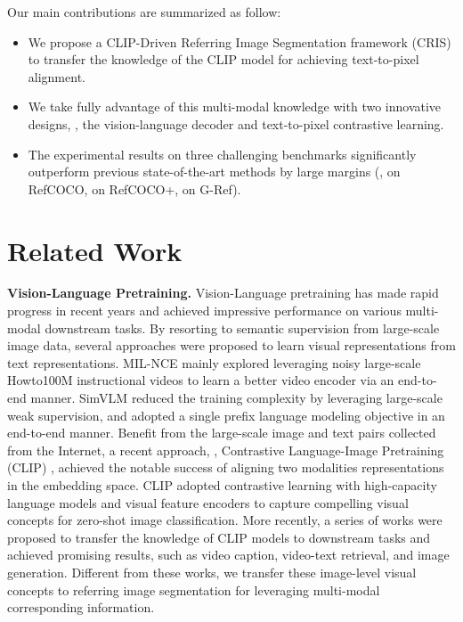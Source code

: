 \documentclass[10pt,twocolumn,letterpaper]{article}
\newcommand{\myparagraph}[1]{{\noindent\bf #1}}
\begin{document}
Our main contributions are summarized as follow:
\begin{itemize}
    \item We propose a CLIP-Driven Referring Image Segmentation framework (CRIS) to transfer the knowledge of the CLIP model for achieving text-to-pixel alignment.
    \item We take fully advantage of this multi-modal knowledge with two innovative designs, \ie, the vision-language decoder and text-to-pixel contrastive learning.
    \item The experimental results on three challenging benchmarks significantly outperform previous state-of-the-art methods by large margins (\eg,  on RefCOCO,  on RefCOCO+,  on G-Ref).
\end{itemize} \section{Related Work}

\myparagraph{Vision-Language Pretraining.}
Vision-Language pretraining has made rapid progress in recent years and achieved impressive performance on various multi-modal downstream tasks.
By resorting to semantic supervision from large-scale image data, several approaches \cite{radford2021learning,wang2021simvlm,miech2020end} were proposed to learn visual representations from text representations. MIL-NCE \cite{miech2020end} mainly explored leveraging noisy large-scale Howto100M \cite{miech2019howto100m} instructional videos to learn a better video encoder via an end-to-end manner.
SimVLM \cite{wang2021simvlm} reduced the training complexity by leveraging large-scale weak supervision, and adopted a single prefix language modeling objective in an end-to-end manner.
Benefit from the large-scale image and text pairs collected from the Internet, a recent approach, \ie, Contrastive Language-Image Pretraining (CLIP) \cite{radford2021learning}, achieved the notable success of aligning two modalities representations in the embedding space.
CLIP adopted contrastive learning with high-capacity language models and visual feature encoders to capture compelling visual concepts for zero-shot image classification.
More recently, a series of works  \cite{tang2021clip4caption,luo2021clip4clip,fang2021clip2video,patashnik2021styleclip} were proposed to transfer the knowledge of CLIP models to downstream tasks and achieved promising results, such as video caption, video-text retrieval, and image generation.
Different from these works, we transfer these image-level visual concepts to referring image segmentation for leveraging multi-modal corresponding information.
\end{document}
